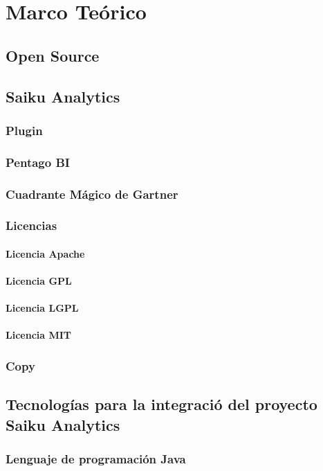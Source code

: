 \chapter{Marco Teórico} \label{chapter:II}
\section{Open Source}
\section{Saiku Analytics}
	\subsection{Plugin}
	\subsection{Pentago BI}
	\subsection{Cuadrante M\'{a}gico de Gartner}
	\subsection{Licencias}
		\subsubsection{Licencia Apache}
		\subsubsection{Licencia GPL}
		\subsubsection{Licencia LGPL}
		\subsubsection{Licencia MIT}
	\subsection{Copy}
\section{Tecnolog\'{i}as para la integraci\'{o} del proyecto Saiku Analytics}		
	\subsection{Lenguaje de programaci\'{o}n Java}
